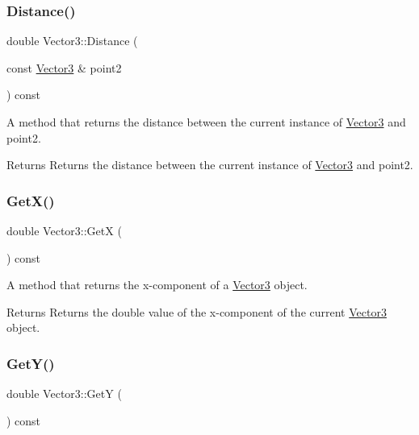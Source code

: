 \subsubsection{\texorpdfstring{Distance()}{Distance()}}
{\footnotesize\ttfamily double Vector3\+::\+Distance (\begin{DoxyParamCaption}\item[{const \hyperlink{classVector3}{Vector3} \&}]{point2 }\end{DoxyParamCaption}) const}



A method that returns the distance between the current instance of \hyperlink{classVector3}{Vector3} and point2. 

\begin{DoxyReturn}{Returns}
Returns the distance between the current instance of \hyperlink{classVector3}{Vector3} and point2. 
\end{DoxyReturn}
\mbox{\label{classVector3_ad4607794c0c8cc99b3be516b69d95030}} 
\subsubsection{\texorpdfstring{Get\+X()}{GetX()}}
{\footnotesize\ttfamily double Vector3\+::\+GetX (\begin{DoxyParamCaption}{ }\end{DoxyParamCaption}) const}



A method that returns the x-\/component of a \hyperlink{classVector3}{Vector3} object. 

\begin{DoxyReturn}{Returns}
Returns the double value of the x-\/component of the current \hyperlink{classVector3}{Vector3} object. 
\end{DoxyReturn}
\mbox{\label{classVector3_a31995bcdcdd4363a5e467f4ade0abf9b}} 
\subsubsection{\texorpdfstring{Get\+Y()}{GetY()}}
{\footnotesize\ttfamily double Vector3\+::\+GetY (\begin{DoxyParamCaption}{ }\end{DoxyParamCaption}) const}



